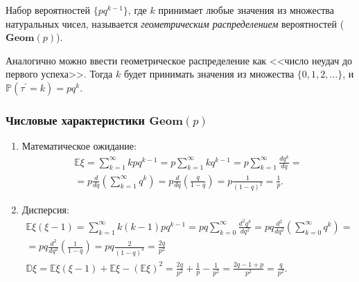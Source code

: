 \begin{defn}
    Набор вероятностей $\{p q^{k-1}\}$, где $k$ принимает любые значения из множества натуральных чисел, называется \textit{геометрическим распределением} вероятностей ($\mathbf{Geom}(p)$).
\end{defn}

Аналогично можно ввести геометрическое распределение как <<число неудач до первого успеха>>. 
Тогда $k$ будет принимать значения из множества $\{0, 1, 2, \ldots\}$, и $\mathbb{P}(\tau^{\prime} = k) = pq^k$.

\subsubsection{Числовые характеристики $\mathbf{Geom}(p)$}
\begin{enumerate}
    \item Математическое ожидание:
    \begin{multline*}
        \mathbb{E} \xi=\sum\limits_{k=1}^{\infty} k p q^{k-1}=p \sum\limits_{k=1}^{\infty} k q^{k-1}=p \sum\limits_{k=1}^{\infty} \frac{d q^{k}}{d q} = \\
        = p \frac{d}{d q}\left(\sum\limits_{k=1}^{\infty} q^{k}\right)=p \frac{d}{d q}\left(\frac{q}{1-q}\right)=p \frac{1}{(1-q)^{2}}=\frac{1}{p}.
    \end{multline*}
    \item Дисперсия:
    \begin{multline*}
        \mathbb{E} \xi(\xi-1)=\sum\limits_{k=1}^{\infty} k(k-1) p q^{k-1}=p q \sum\limits_{k=0}^{\infty} \frac{d^{2} q^{k}}{d q^{2}} =p q \frac{d^{2}}{d q^{2}}\left(\sum\limits_{k=0}^{\infty} q^{k}\right) = \\
        =p q \frac{d^{2}}{d q^{2}}\left(\frac{1}{1-q}\right)=p q \frac{2}{(1-q)^{3}}=\frac{2 q}{p^{2}} \\
        \mathbb{D} \xi=\mathbb{E} \xi(\xi-1)+\mathbb{E} \xi-(\mathbb{E} \xi)^{2}=\frac{2 q}{p^{2}}+\frac{1}{p}-\frac{1}{p^{2}}=\frac{2 q-1+p}{p^{2}}=\frac{q}{p^{2}}.
    \end{multline*}
\end{enumerate}

